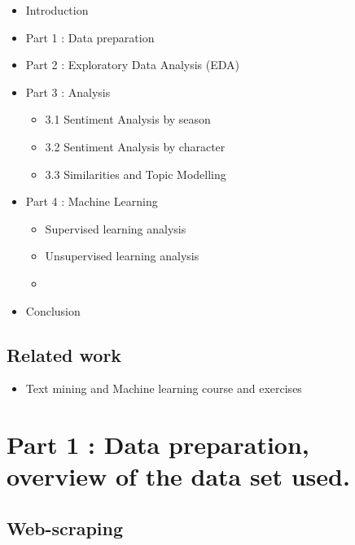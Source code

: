 \documentclass[
]{article}
\providecommand{\tightlist}{%
  \setlength{\itemsep}{0pt}\setlength{\parskip}{0pt}}
\begin{document}
\begin{itemize}
\tightlist
\item
  Introduction
\item
  Part 1 : Data preparation
\item
  Part 2 : Exploratory Data Analysis (EDA)
\item
  Part 3 : Analysis

  \begin{itemize}
  \tightlist
  \item
    3.1 Sentiment Analysis by season
  \item
    3.2 Sentiment Analysis by character
  \item
    3.3 Similarities and Topic Modelling
  \end{itemize}
\item
  Part 4 : Machine Learning

  \begin{itemize}
  \tightlist
  \item
    Supervised learning analysis
  \item
    Unsupervised learning analysis
  \item
  \end{itemize}
\item
  Conclusion
\end{itemize}

\hypertarget{related-work}{%
\subsection{Related work}\label{related-work}}

\begin{itemize}
\tightlist
\item
  Text mining and Machine learning course and exercises
\end{itemize}

\hypertarget{part-1-data-preparation-overview-of-the-data-set-used.}{%
\section{Part 1 : Data preparation, overview of the data set
used.}\label{part-1-data-preparation-overview-of-the-data-set-used.}}

\hypertarget{web-scraping}{%
\subsection{Web-scraping}\label{web-scraping}}
\end{document}
